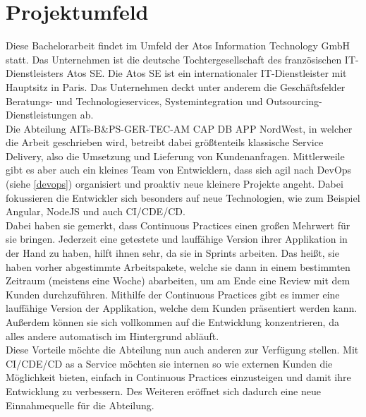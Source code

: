 \section{Projektumfeld}
Diese Bachelorarbeit findet im Umfeld der Atos Information Technology GmbH statt. Das Unternehmen ist die deutsche Tochtergesellschaft des französischen IT-Dienstleisters Atos SE. Die Atos SE ist ein internationaler IT-Dienstleister mit Hauptsitz in Paris. Das Unternehmen deckt unter anderem die Geschäftsfelder Beratungs- und Technologieservices, Systemintegration und Outsourcing-Dienstleistungen ab.\\
Die Abteilung AITs-B\&PS-GER-TEC-AM CAP DB APP NordWest, in welcher die Arbeit geschrieben wird, betreibt dabei größtenteils klassische Service Delivery, also die Umsetzung und Lieferung von Kundenanfragen. Mittlerweile gibt es aber auch ein kleines Team von Entwicklern, dass sich agil nach DevOps (siehe \ref{devops}) organisiert und proaktiv neue kleinere Projekte angeht. Dabei fokussieren die Entwickler sich besonders auf neue Technologien, wie zum Beispiel Angular, NodeJS und auch \ac{CI}/\ac{CDE}/\ac{CD}.\\ 
Dabei haben sie gemerkt, dass Continuous Practices einen großen Mehrwert für sie bringen. Jederzeit eine getestete und lauffähige Version ihrer Applikation in der Hand zu haben, hilft ihnen sehr, da sie in Sprints arbeiten. Das heißt, sie haben vorher abgestimmte Arbeitspakete, welche sie dann in einem bestimmten Zeitraum (meistens eine Woche) abarbeiten, um am Ende eine Review mit dem Kunden durchzuführen. Mithilfe der Continuous Practices gibt es immer eine lauffähige Version der Applikation, welche dem Kunden präsentiert werden kann. Außerdem können sie sich vollkommen auf die Entwicklung konzentrieren, da alles andere automatisch im Hintergrund abläuft.\\ 
Diese Vorteile möchte die Abteilung nun auch anderen zur Verfügung stellen. Mit \ac{CI}/\ac{CDE}/\ac{CD} as a Service möchten sie internen so wie externen Kunden die Möglichkeit bieten, einfach in Continuous Practices einzusteigen und damit ihre Entwicklung zu verbessern. Des Weiteren eröffnet sich dadurch eine neue Einnahmequelle für die Abteilung.
